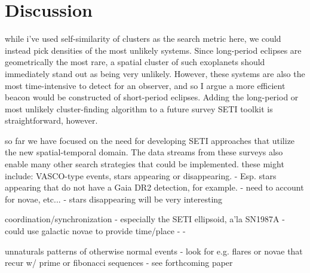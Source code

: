 \documentclass[twocolumn]{aastex62}
\begin{document}
\section{Discussion}
\label{sec:discussion}
%
%
%
%

while i've used self-similarity of clusters as the search metric here, we could instead pick densities of the most unlikely systems. Since long-period eclipses are geometrically the most rare, a spatial cluster of such exoplanets should immediately stand out as being very unlikely. However, these systems are also the most time-intensive to detect for an observer, and so I argue a more efficient beacon would be constructed of short-period eclipses. Adding the long-period or most unlikely cluster-finding algorithm to a future survey SETI toolkit is straightforward, however.

so far we have focused on the need for developing SETI approaches that utilize the new spatial-temporal domain. The data streams from these surveys also enable many other search strategies that could be implemented. these might include:
VASCO-type events, stars appearing or disappearing. \citep{villarroel2016}
	- Esp. stars appearing that do not have a Gaia DR2 detection, for example.
	- need to account for novae, etc...
	- stars disappearing will be very interesting

coordination/synchronization \citep{makovetskii1977,shostak2004}
        - especially the SETI ellipsoid, a'la SN1987A \citep{lemarchand1994}
        - could use galactic novae to provide time/place
        - %
        - %

unnaturals patterns of otherwise normal events
	- look for e.g. flares or novae that recur w/ prime or fibonacci sequences
	- see forthcoming paper
\end{document}
